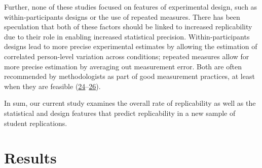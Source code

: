 \documentclass[
  english,
  a4paper,
]{article}
\begin{document}
Further, none of these studies focused on features of experimental design, such as within-participants designs or the use of repeated measures. There has been speculation that both of these factors should be linked to increased replicability due to their role in enabling increased statistical precision. Within-participants designs lead to more precise experimental estimates by allowing the estimation of correlated person-level variation across conditions; repeated measures allow for more precise estimation by averaging out measurement error. Both are often recommended by methodologists as part of good measurement practices, at least when they are feasible (\protect\hyperlink{ref-rosenthal2008}{24}--\protect\hyperlink{ref-frank2023}{26}).

In sum, our current study examines the overall rate of replicability as well as the statistical and design features that predict replicability in a new sample of student replications.

\hypertarget{results}{%
\section{Results}\label{results}}

    
\end{document}
